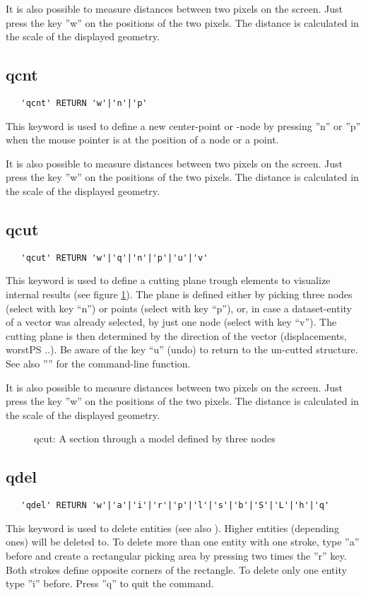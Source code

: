 \documentclass{article}
\begin{document}
It is also possible to measure distances between two pixels on the screen. Just press the key ''w'' on the positions of the two pixels. The distance is calculated in the scale of the displayed geometry.

\subsection{\label{qcnt}qcnt}
\begin{verbatim}
   'qcnt' RETURN 'w'|'n'|'p' 
\end{verbatim}
This keyword is used to define a new center-point or -node by pressing ''n'' or ''p'' when the mouse pointer is at the position of a node or a point.
 
It is also possible to measure distances between two pixels on the screen. Just press the key ''w'' on the positions of the two pixels. The distance is calculated in the scale of the displayed geometry.

\subsection{\label{qcut}qcut}
\begin{verbatim}
   'qcut' RETURN 'w'|'q'|'n'|'p'|'u'|'v'
\end{verbatim}
This keyword is used to define a cutting plane trough elements to visualize internal results (see figure \ref{qcutp}). The plane is defined either by picking three nodes (select with key ``n'') or points (select with key ``p''), or, in case a dataset-entity of a vector was already selected, by just one node (select with key ``v''). The cutting plane is then determined by the direction of the vector (displacements, worstPS ..). Be aware of the key ``u'' (undo) to return to the un-cutted structure. See also '''' for the command-line function.
 
It is also possible to measure distances between two pixels on the screen. Just press the key ''w'' on the positions of the two pixels. The distance is calculated in the scale of the displayed geometry.
  
\begin{figure}[h]
\caption{\label{qcutp}qcut: A section through a model defined by three nodes}
\end{figure}

\subsection{\label{qdel}qdel}
\begin{verbatim}
   'qdel' RETURN 'w'|'a'|'i'|'r'|'p'|'l'|'s'|'b'|'S'|'L'|'h'|'q' 
\end{verbatim}
This keyword is used to delete entities (see also ). Higher entities (depending ones) will be deleted to. To delete more than one entity with one stroke, type ''a'' before and create a rectangular picking area by pressing two times the ''r'' key. Both strokes define opposite corners of the rectangle. To delete only one entity type ''i'' before. Press ''q'' to quit the command. 
\end{document}
